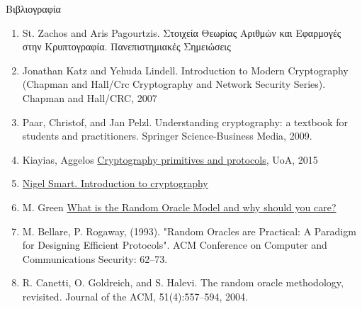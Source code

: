 \documentclass[handout]{beamer}
\begin{document}
\begin{frame}[allowframebreaks]{Βιβλιογραφία}

\begin{tiny}
\begin{enumerate}
\item St. Zachos and Aris Pagourtzis. Στοιχεία Θεωρίας Αριθμών και Εφαρμογές στην Κρυπτογραφία. Πανεπιστημιακές Σημειώσεις
\item Jonathan Katz and Yehuda Lindell. Introduction to Modern Cryptography (Chapman and Hall/Crc Cryptography and Network Security Series). Chapman
and Hall/CRC, 2007
\item Paar, Christof, and Jan Pelzl. Understanding cryptography: a textbook for students and practitioners. Springer Science-Business Media, 2009.
\item Kiayias, Aggelos  \href{http://crypto.di.uoa.gr/class/Kryptographia/Semeioseis_files/Cryptograph_Primitives_and_Protocols.pdf}{Cryptography primitives and protocols}, UoA, 2015
\item \href{http://goo.gl/b75I29}{Nigel Smart. Introduction to cryptography} 
\medskip
\item M. Green \href{http://blog.cryptographyengineering.com/2011/09/what-is-random-oracle-model-and-why.html}{What is the Random Oracle Model and why should you care?}
\item M. Bellare, P. Rogaway, (1993). "Random Oracles are Practical: A Paradigm for Designing Efficient Protocols". ACM Conference on Computer and Communications Security: 62–73.
\item R. Canetti, O. Goldreich, and S. Halevi.  The random oracle methodology, revisited. Journal of the ACM, 51(4):557–594, 2004.
\end{enumerate}
\end{tiny}
\end{frame}
\end{document}
